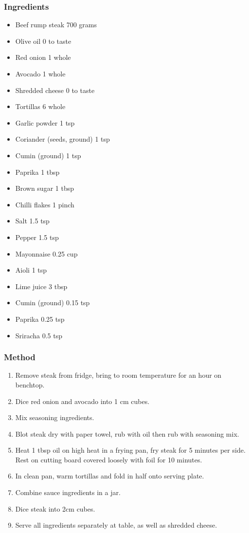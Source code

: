 \documentclass[]{article}
\begin{document}
\subsubsection*{\Large Ingredients}
\begin{multicols}{2}
\begin{itemize}
 \item Beef rump steak \hfill 700 grams
 \item Olive oil \hfill 0 to taste
 \item Red onion \hfill 1 whole
 \item Avocado \hfill 1 whole
 \item Shredded cheese \hfill 0 to taste
 \item Tortillas \hfill 6 whole
 \item Garlic powder \hfill 1 tsp
 \item Coriander (seeds, ground) \hfill 1 tsp
 \item Cumin (ground) \hfill 1 tsp
 \item Paprika \hfill 1 tbsp
 \item Brown sugar \hfill 1 tbsp
 \item Chilli flakes \hfill 1 pinch
 \item Salt \hfill 1.5 tsp
 \item Pepper \hfill 1.5 tsp
 \item Mayonnaise \hfill 0.25 cup
 \item Aioli \hfill 1 tsp
 \item Lime juice \hfill 3 tbsp
 \item Cumin (ground) \hfill 0.15 tsp
 \item Paprika \hfill 0.25 tsp
 \item Sriracha \hfill 0.5 tsp
\end{itemize}
\end{multicols}
\subsubsection*{\Large Method}
\begin{enumerate}[font=\huge\color{accent}]
	\item Remove steak from fridge, bring to room temperature for an hour on benchtop.
	\item Dice red onion and avocado into 1 cm cubes.
	\item Mix seasoning ingredients.
	\item Blot steak dry with paper towel, rub with oil then rub with seasoning mix.
	\item Heat 1 tbsp oil on high heat in a frying pan, fry steak for 5 minutes per side. Rest on cutting board covered loosely with foil for 10 minutes.
	\item In clean pan, warm tortillas and fold in half onto serving plate.
	\item Combine sauce ingredients in a jar.
	\item Dice steak into 2cm cubes.
	\item Serve all ingredients separately at table, as well as shredded cheese.
\end{enumerate}
\newpage
\end{document}
